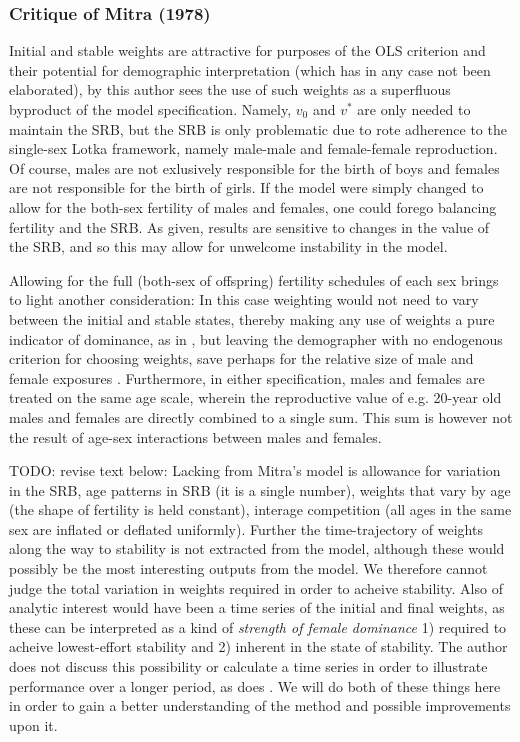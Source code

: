 \subsubsection{Critique of Mitra (1978)}
Initial and stable weights are attractive for purposes of the OLS
criterion and their potential for demographic interpretation (which has in any
case not been elaborated), by this author sees the use of such weights as
a superfluous byproduct of the model specification. Namely, $v_0$ and $v^\ast$
are only needed to maintain the SRB, but the SRB is only problematic due to
rote adherence to the single-sex Lotka framework, namely male-male and
female-female reproduction. Of course, males are not exlusively responsible for
the birth of boys and females are not responsible for the birth of girls. If the
model were simply changed to allow for the both-sex fertility of males and
females, one could forego balancing fertility and the SRB. As given, results are
sensitive to changes in the value of the SRB, and so this may allow for
unwelcome instability in the model.

Allowing for the full (both-sex of offspring) fertility schedules of each sex
brings to light another consideration: In this case weighting would not need to
vary between the initial and stable states, thereby making any use of weights a pure
indicator of dominance, as in \citet{goodman1967age}, but leaving the
demographer with no endogenous criterion for choosing weights, save perhaps for
the relative size of male and female exposures \citep{mitra1976effect}.
Furthermore, in either specification, males and females are treated on the same age scale, wherein the reproductive value of e.g. 20-year old males and females are
directly combined to a single sum. This sum is however not the result of age-sex
interactions between males and females.

TODO: revise text below:
Lacking from Mitra's model is allowance for variation in the SRB, age patterns
in SRB (it is a single number), weights that vary by age (the shape of
fertility is held constant), interage competition (all ages in the same sex are
inflated or deflated uniformly). Further the time-trajectory of weights along
the way to stability is not extracted from the model, although these would
possibly be the most interesting outputs from the model. We therefore cannot
judge the total variation in weights required in order to acheive stability.
Also of analytic interest would have been a time series of the initial and final
weights, as these can be interpreted as a kind of \textit{strength of female
dominance} 1) required to acheive lowest-effort stability and 2) inherent in
the state of stability. The author does not discuss this possibility or
calculate a time series in order to illustrate performance over a longer 
period, as does \citet{gupta1973, gupta1978general}. We will do both of these
things here in order to gain a better understanding of the method and possible
improvements upon it.

